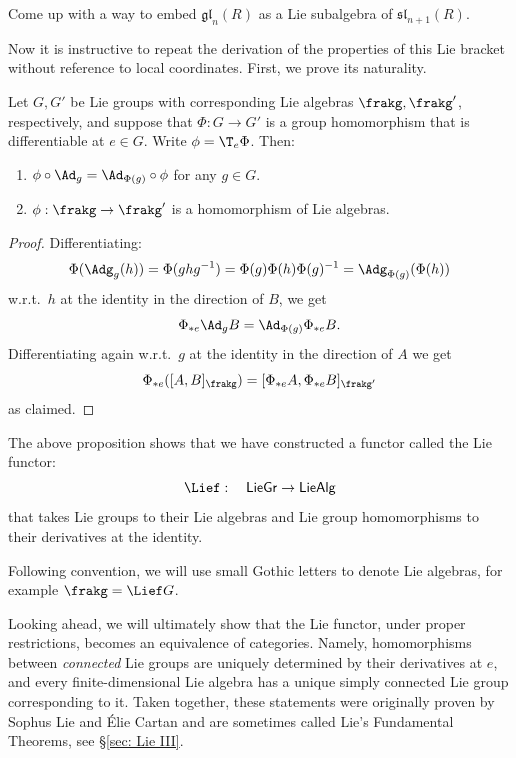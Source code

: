 \begin{xca}
    Come up with a way to embed $\mathfrak{gl}_n(R)$ as a Lie subalgebra of $\mathfrak{sl}_{n+1}(R)$.
\end{xca}

Now it is instructive to repeat the derivation of the properties of this Lie bracket without reference to local coordinates. First, we prove its naturality.

\begin{prop}\label{prop 1.1.3 DK}
    Let $G,G'$ be Lie groups with corresponding Lie algebras $\frakg,\frakg'$, respectively, and suppose that $\Phi:G\to G'$ is a group homomorphism that is differentiable at $e\in G$. Write $\phi=\T_e \Phi$. Then:
    \begin{enumerate}
        \item $\phi\circ \Ad_g=\Ad_{\Phi(g)}\circ \phi$ for any $g\in G$.
        \item $\phi:\frakg\to\frakg'$ is a homomorphism of Lie algebras.
    \end{enumerate}
\end{prop}
\begin{proof}
    Differentiating:
    \[\Phi(\Adg_g(h))=\Phi(ghg^{-1})=\Phi(g)\Phi(h)\Phi(g)^{-1}=\Adg_{\Phi(g)}(\Phi(h))\]
    w.r.t.\ $h$ at the identity in the direction of $B$, we get
    \[\Phi_{\ast e} \Ad_g B=\Ad_{\Phi(g)} \Phi_{\ast e}B.\]
    Differentiating again w.r.t.\ $g$ at the identity in the direction of $A$ we get
    \[\Phi_{\ast e}([A,B]_{\frakg})=[\Phi_{\ast e}A,\Phi_{\ast e}B]_{\frakg'}\]
    as claimed.
\end{proof}
\begin{cor}
    The above proposition shows that we have constructed a functor called the Lie functor:
    \[\Lief:\quad \mathsf{LieGr}\to \mathsf{LieAlg}\]
    that takes Lie groups to their Lie algebras and Lie group homomorphisms to their derivatives at the identity.
\end{cor}

\begin{rem}
    Following convention, we will use small Gothic letters to denote Lie algebras, for example $\frakg=\Lief G$.
\end{rem}

\begin{rem}
    Looking ahead, we will ultimately show that the Lie functor, under proper restrictions, becomes an equivalence of categories. Namely, homomorphisms between \emph{connected} Lie groups are uniquely determined by their derivatives at $e$, and every finite-dimensional Lie algebra has a unique simply connected Lie group corresponding to it. Taken together, these statements were originally proven by Sophus Lie and \'Elie Cartan and are sometimes called Lie's Fundamental Theorems, see \S\ref{sec: Lie III}.
\end{rem}


